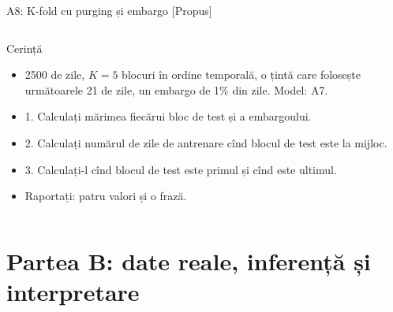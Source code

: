 \begin{frame}{A8: K-fold cu purging și embargo [Propus]}
\propsub
\itemsize{\scriptsize}
\begin{columns}[T]
\begin{column}{\taskw}
\begin{block}{Cerință}
\begin{itemize}
    \item 2500 de zile, $K = 5$ blocuri în ordine temporală, o țintă care folosește următoarele 21 de zile, un embargo de 1\% din zile. Model: A7.
    \item 1. Calculați mărimea fiecărui bloc de test și a embargoului.
    \item 2. Calculați numărul de zile de antrenare cînd blocul de test este la mijloc.
    \item 3. Calculați-l cînd blocul de test este primul și cînd este ultimul.
    \item Raportați: patru valori și o frază.
\end{itemize}
\end{block}
\end{column}
\begin{column}{\solw}
\end{column}
\end{columns}
\end{frame}


\section{Partea B: date reale, inferență și interpretare}

